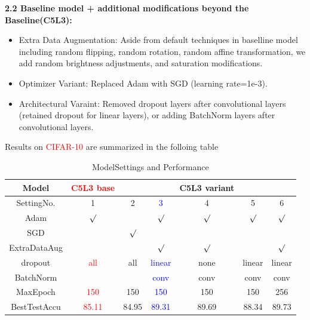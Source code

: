 \documentclass{article}
\begin{document}
\noindent\textbf{2.2 Baseline model + additional modifications beyond the Baseline(C5L3):}
\begin{itemize}
  \item Extra Data Augmentation: Aside from default techniques in baselline model including random flipping, random rotation, random affine transformation, we add random brightness adjustments, and saturation modifications.
  \item Optimizer Variant: Replaced Adam with SGD (learning rate=1e-3).
  \item Architectural Varaint: Removed dropout layers after convolutional layers (retained dropout for linear layers), or adding BatchNorm layers after convolutional layers.
\end{itemize}


\noindent Results on \textcolor{red}{CIFAR-10} are summarized in the folloing table

\begin{table}[htbp]
  \centering
  \caption{ModelSettings and Performance}
  \label{tab:model-compare}
  \begin{tabular}{|c|c|ccccc|} 
    \hline
    Model &\textcolor{red}{C5L3 base} &  &  & C5L3 variant & &   \\
    \hline
    SettingNo. &1 &2  &\textcolor{blue}{3}  & 4 &5 &6   \\
    \hline
    Adam &  \textcolor{red}{ $\surd$ }   &  & \textcolor{blue}{$\surd$} & $\surd$ & $\surd$  & $\surd$\\ 
    SGD & & $\surd$   & & &  &\\
    ExtraDataAug& &  & \textcolor{blue}{$\surd$} &  $\surd$ &  &$\surd$\\
    dropout &\textcolor{red}{all} & all   & \textcolor{blue}{linear}& none & linear  & linear \\ 
    BatchNorm & & & \textcolor{blue}{conv} & conv  & conv & conv \\ 
    MaxEpoch & \textcolor{red}{150} & 150 & \textcolor{blue}{150} & 150  & 150 & 256 \\
    \hline
    BestTestAccu & \textcolor{red}{85.11} &84.95 &\textcolor{blue}{89.31} & 89.69& 88.34 & 89.73 \\
    \hline
  \end{tabular} 
\end{table}
\end{document}

